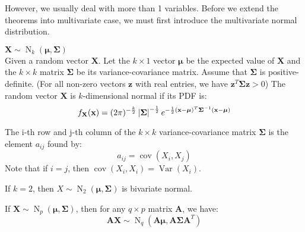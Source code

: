 \documentclass{huhtakm-template-book-v2}
\DeclareMathOperator{\Var}{Var}
\DeclareMathOperator{\cov}{cov}
\DeclareMathOperator{\N}{N}
\begin{document}
\newpage
However, we usually deal with more than 1 variables. Before we extend the theorems into multivariate case, we must first introduce the multivariate normal distribution.
\begin{eg} $\mathbf{X}\sim\N_{k}(\boldsymbol{\mu},\mathbf{\Sigma})$\\
	Given a random vector $\mathbf{X}$. Let the $k\times 1$ vector $\boldsymbol{\mu}$ be the expected value of $\mathbf{X}$ and the $k\times k$ matrix $\mathbf{\Sigma}$ be its variance-covariance matrix. Assume that $\mathbf{\Sigma}$ is positive-definite. (For all non-zero vectors $\mathbf{z}$ with real entries, we have $\mathbf{z}^{T}\mathbf{\Sigma z}>0$) The random vector $\mathbf{X}$ is $k$-dimensional normal if its PDF is:
	\begin{equation*}
		f_{\mathbf{X}}(\mathbf{x})=(2\pi)^{-\frac{k}{2}}\left|{\mathbf{\Sigma}}\right|^{-\frac{1}{2}}e^{-\frac{1}{2}(\mathbf{x}-\boldsymbol{\mu})^{T}\mathbf{\Sigma}^{-1}(\mathbf{x}-\boldsymbol{\mu})}
	\end{equation*}
\end{eg}
\begin{rem}
	The i-th row and j-th column of the $k\times k$ variance-covariance matrix $\mathbf{\Sigma}$ is the element $a_{ij}$ found by:
	\begin{equation*}
		a_{ij}=\cov(X_{i},X_{j})
	\end{equation*}
	Note that if $i=j$, then $\cov(X_{i},X_{i})=\Var(X_{i})$.
\end{rem}
\begin{eg}
	If $k=2$, then $X\sim\N_{2}(\boldsymbol{\mu},\mathbf{\Sigma})$ is bivariate normal.
\end{eg}
\begin{lem}
	\label{Chapter 1 (Lemma) Distribution of matrix multiplication with random vector}
	If $\mathbf{X}\sim\N_{p}(\boldsymbol{\mu},\mathbf{\Sigma})$, then for any $q\times p$ matrix $\mathbf{A}$, we have:
	\begin{equation*}
		\mathbf{AX}\sim\N_{q}(\mathbf{A}\boldsymbol{\mu},\mathbf{A\Sigma A}^{T})
	\end{equation*}
\end{lem}
\end{document}
